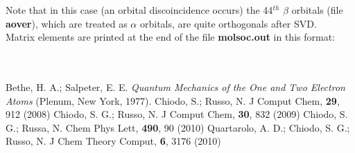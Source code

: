 \documentclass[a4paper,12pt]{article}
\begin{document}
Note that in this case (an orbital discoincidence occurs) the 44$^{th}$ $\beta$ orbitals 
(file {\bf aover}), which are treated as $\alpha$ orbitals,
are quite orthogonals after SVD. \\ 
Matrix elements are printed at the end of the file {\bf molsoc.out} in this format: \\ \\
 \\
\newpage
%
\begin{thebibliography}{9999,AIP}
 Bethe, H. A.; Salpeter, E. E. {\em Quantum Mechanics of the One and Two Electron Atoms} (Plenum, New York, 1977).
 Chiodo, S.; Russo, N. J Comput Chem, {\bf 29}, 912 (2008)
 Chiodo, S. G.; Russo, N. J Comput Chem, {\bf 30}, 832 (2009)
 Chiodo, S. G.; Russa, N. Chem Phys Lett, {\bf 490}, 90 (2010)
 Quartarolo, A. D.; Chiodo, S. G.; Russo, N. J Chem Theory Comput, {\bf 6}, 3176 (2010) 
\end{thebibliography}
\end{document}
